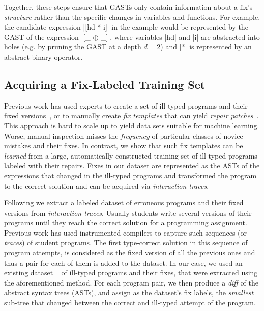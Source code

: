 Together, these steps ensure that GASTs only contain information about a fix's
\emph{structure} rather than the specific changes in variables and functions.
%
For example, the candidate expression |[hd * i]| in the \mbd example would be
represented by the GAST of the expression |[_ $\oplus$ _]|, where variables |hd|
and |i| are abstracted into holes (e.g. by pruning the GAST at a depth $d=2$)
and |*| is represented by an abstract binary operator.


\subsection{Acquiring a Fix-Labeled Training Set}
\label{sec:overview:data}

Previous work has used experts to create a set of ill-typed programs and their
fixed versions~\citep[][]{Lerner2007-dt, Loncaric2016-uk}, or to manually create
\emph{fix templates} that can yield \emph{repair
patches}~\citep[][]{martinez2013automatically,martinez2015mining}.
%
This approach is hard to scale up to yield data sets suitable for machine
learning. Worse, manual inspection misses the \emph{frequency} of particular
classes of novice mistakes and their fixes.
%
In contrast, we show that such fix templates can be \emph{learned} from a large,
automatically constructed training set of ill-typed programs labeled with their
repairs.
%
Fixes in our dataset are represented as the ASTs of the expressions that changed
in the ill-typed programs and transformed the program to the correct solution
and can be acquired via \emph{interaction traces}.

Following \citep{Seidel:2017} we extract a labeled dataset of erroneous programs
and their fixed versions from \emph{interaction traces}. Usually students write
several versions of their programs until they reach the correct solution for a
programming assignment. Previous work has used instrumented compilers to capture
such sequences (or \emph{traces}) of student programs. The first type-correct
solution in this sequence of program attempts, is considered as the fixed
version of all the previous ones and thus a pair for each of them is added to
the dataset. In our case, we used an existing dataset
~\citep[][]{yunounderstand, Seidel:2017} of ill-typed \ocaml programs and their
fixes, that were extracted using the aforementioned method. For each program
pair, we then produce a \emph{diff} of the abstract syntax trees (ASTs), and
assign as the dataset's fix labels, the \emph{smallest} sub-tree that changed
between the correct and ill-typed attempt of the program.

